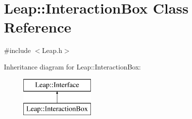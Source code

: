 \hypertarget{class_leap_1_1_interaction_box}{\section{Leap\+:\+:Interaction\+Box Class Reference}
\label{class_leap_1_1_interaction_box}
}


{\ttfamily \#include $<$Leap.\+h$>$}

Inheritance diagram for Leap\+:\+:Interaction\+Box\+:\begin{figure}[H]
\begin{center}
\leavevmode
\includegraphics[height=2.000000cm]{class_leap_1_1_interaction_box}
\end{center}
\end{figure}
